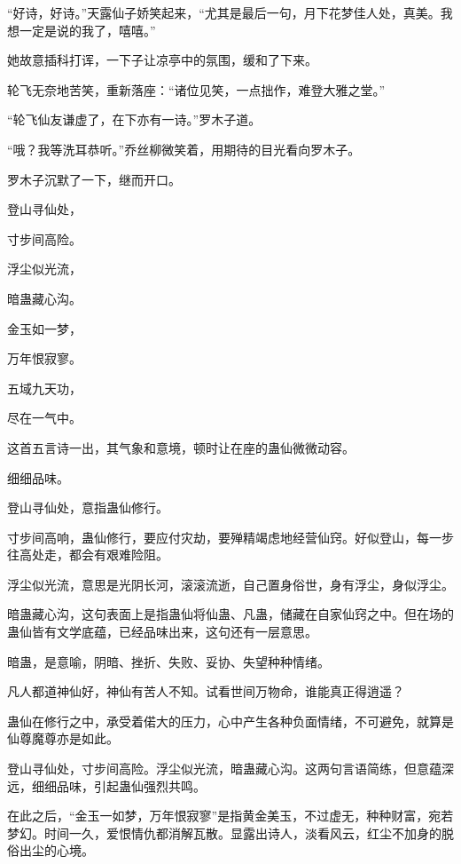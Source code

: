 
\begin{this_body}

“好诗，好诗。”天露仙子娇笑起来，“尤其是最后一句，月下花梦佳人处，真美。我想一定是说的我了，嘻嘻。”

她故意插科打诨，一下子让凉亭中的氛围，缓和了下来。

轮飞无奈地苦笑，重新落座：“诸位见笑，一点拙作，难登大雅之堂。”

“轮飞仙友谦虚了，在下亦有一诗。”罗木子道。

“哦？我等洗耳恭听。”乔丝柳微笑着，用期待的目光看向罗木子。

罗木子沉默了一下，继而开口。

登山寻仙处，

寸步间高险。

浮尘似光流，

暗蛊藏心沟。

金玉如一梦，

万年恨寂寥。

五域九天功，

尽在一气中。

这首五言诗一出，其气象和意境，顿时让在座的蛊仙微微动容。

细细品味。

登山寻仙处，意指蛊仙修行。

寸步间高响，蛊仙修行，要应付灾劫，要殚精竭虑地经营仙窍。好似登山，每一步往高处走，都会有艰难险阻。

浮尘似光流，意思是光阴长河，滚滚流逝，自己置身俗世，身有浮尘，身似浮尘。

暗蛊藏心沟，这句表面上是指蛊仙将仙蛊、凡蛊，储藏在自家仙窍之中。但在场的蛊仙皆有文学底蕴，已经品味出来，这句还有一层意思。

暗蛊，是意喻，阴暗、挫折、失败、妥协、失望种种情绪。

凡人都道神仙好，神仙有苦人不知。试看世间万物命，谁能真正得逍遥？

蛊仙在修行之中，承受着偌大的压力，心中产生各种负面情绪，不可避免，就算是仙尊魔尊亦是如此。

登山寻仙处，寸步间高险。浮尘似光流，暗蛊藏心沟。这两句言语简练，但意蕴深远，细细品味，引起蛊仙强烈共鸣。

在此之后，“金玉一如梦，万年恨寂寥”是指黄金美玉，不过虚无，种种财富，宛若梦幻。时间一久，爱恨情仇都消解瓦散。显露出诗人，淡看风云，红尘不加身的脱俗出尘的心境。


\end{this_body}

